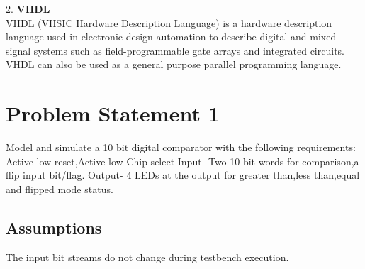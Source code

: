 \documentclass[11pt]{report}
\begin{document}
\begin{flushleft}
2. \textbf{VHDL}\\
VHDL (VHSIC Hardware Description Language) is a hardware description language used in electronic design automation to describe digital and mixed-signal systems such as field-programmable gate arrays and integrated circuits. VHDL can also be used as a general purpose parallel programming language.

\end{flushleft}
\newpage
\section{Problem Statement 1}
Model and simulate a 10 bit digital comparator with the following requirements:
Active low reset,Active low Chip select
Input- Two 10 bit words for comparison,a flip input bit/flag.
Output- 4 LEDs at the output for greater than,less than,equal and flipped mode status.

\subsection{Assumptions}
The input bit streams do not change during testbench execution.
\end{document}
